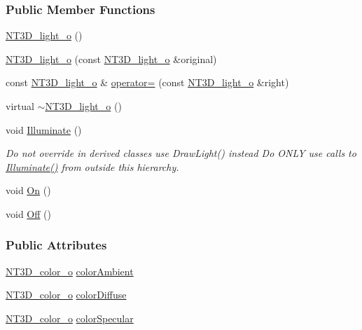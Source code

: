 \subsubsection*{Public Member Functions}
\begin{DoxyCompactItemize}
\item 
\hyperlink{class_n_t3_d__light__o_a337101f2741ab79f03f4c8a93dafe485}{NT3D\_\-light\_\-o} ()
\item 
\hyperlink{class_n_t3_d__light__o_a932238de23aa33e8ceb1b214c84677bd}{NT3D\_\-light\_\-o} (const \hyperlink{class_n_t3_d__light__o}{NT3D\_\-light\_\-o} \&original)
\item 
const \hyperlink{class_n_t3_d__light__o}{NT3D\_\-light\_\-o} \& \hyperlink{class_n_t3_d__light__o_a0aa4e70e24d400d463560886d3c9262f}{operator=} (const \hyperlink{class_n_t3_d__light__o}{NT3D\_\-light\_\-o} \&right)
\item 
virtual \hyperlink{class_n_t3_d__light__o_a337f6ab9d405ba2dedd604d45f532441}{$\sim$NT3D\_\-light\_\-o} ()
\item 
void \hyperlink{class_n_t3_d__light__o_aa19feee937ca62b9cc57345e243bbf97}{Illuminate} ()
\begin{DoxyCompactList}\small\item\em Do not override in derived classes use DrawLight() instead Do ONLY use calls to \hyperlink{class_n_t3_d__light__o_aa19feee937ca62b9cc57345e243bbf97}{Illuminate()} from outside this hierarchy. \item\end{DoxyCompactList}\item 
void \hyperlink{class_n_t3_d__light__o_af5f7a52b03cd26dc6acee68dbec6273b}{On} ()
\item 
void \hyperlink{class_n_t3_d__light__o_adc6f859b8897bb595377e2ea66fbf526}{Off} ()
\end{DoxyCompactItemize}
\subsubsection*{Public Attributes}
\begin{DoxyCompactItemize}
\item 
\hyperlink{class_n_t3_d__color__o}{NT3D\_\-color\_\-o} \hyperlink{class_n_t3_d__light__o_a0a2eb91320561f70e6e8d9225eac48f6}{colorAmbient}
\item 
\hyperlink{class_n_t3_d__color__o}{NT3D\_\-color\_\-o} \hyperlink{class_n_t3_d__light__o_a271304f2bef7e9fb4ab228689d4f4f7d}{colorDiffuse}
\item 
\hyperlink{class_n_t3_d__color__o}{NT3D\_\-color\_\-o} \hyperlink{class_n_t3_d__light__o_a925f6392c85cd8d7938e331bc69aedb4}{colorSpecular}
\end{DoxyCompactItemize}
